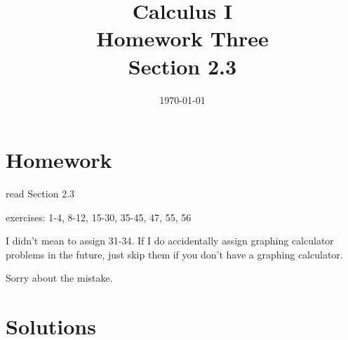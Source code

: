 \documentclass[letterpaper, landscape]{exam}
\title{Calculus I \\ Homework Three \\ Section 2.3}
\author{}
\date{\today}
\begin{document}
  \maketitle

  \section{Homework}
    \begin{itemize*}
      \item read Section 2.3
      \item exercises: 1-4, 8-12, 15-30, 35-45, 47, 55, 56
    \end{itemize*}

  I didn't mean to assign 31-34. If I do accidentally assign graphing calculator
  problems in the future, just skip them if you don't have a graphing calculator.

  Sorry about the mistake.

  \ifprintanswers

    \section{Solutions}
\end{document}
